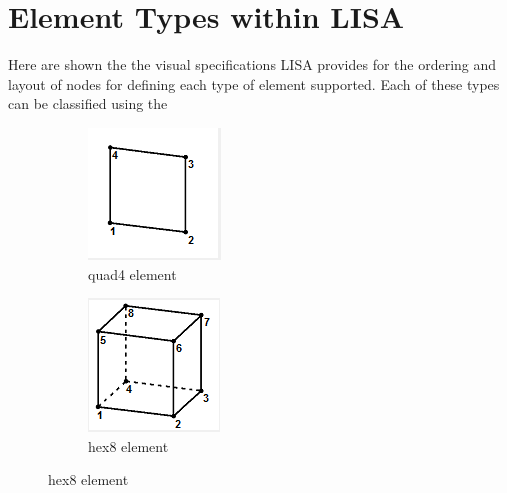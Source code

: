 \appendix

\section{Element Types within LISA}
Here are shown the the visual specifications LISA provides for the ordering and layout of nodes for defining each type of element supported. Each of these types can be classified using the 

\begin{figure}[ht]
\centering
\begin{subfigure}{.5\textwidth}
  \centering
  \includegraphics[width=0.3\linewidth]{../Graphics/LISA-quad4.png}
  \caption{quad4 element}
  \label{fig:sub1}
\end{subfigure}%
\begin{subfigure}{.5\textwidth}
  \centering
  \includegraphics[width=0.3\linewidth]{../Graphics/LISA-hex8.png}
  \caption{hex8 element}
  \label{fig:sub2}
\end{subfigure}
\label{fig:test}
\end{figure}


